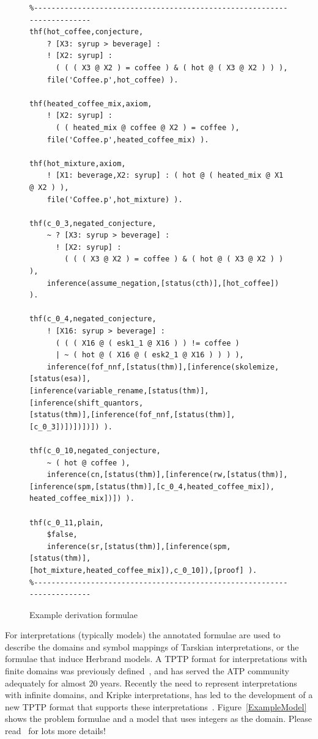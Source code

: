 \documentclass[runningheads]{llncs}
\begin{document}
\begin{figure}[h!]
\centering
{\footnotesize
{\setlength{\baselineskip}{3mm}
\begin{verbatim}
%------------------------------------------------------------------------
thf(hot_coffee,conjecture,
    ? [X3: syrup > beverage] :
    ! [X2: syrup] :
      ( ( ( X3 @ X2 ) = coffee ) & ( hot @ ( X3 @ X2 ) ) ),
    file('Coffee.p',hot_coffee) ).

thf(heated_coffee_mix,axiom,
    ! [X2: syrup] :
      ( ( heated_mix @ coffee @ X2 ) = coffee ),
    file('Coffee.p',heated_coffee_mix) ).

thf(hot_mixture,axiom,
    ! [X1: beverage,X2: syrup] : ( hot @ ( heated_mix @ X1 @ X2 ) ),
    file('Coffee.p',hot_mixture) ).

thf(c_0_3,negated_conjecture,
    ~ ? [X3: syrup > beverage] :
      ! [X2: syrup] :
        ( ( ( X3 @ X2 ) = coffee ) & ( hot @ ( X3 @ X2 ) ) ),
    inference(assume_negation,[status(cth)],[hot_coffee]) ).

thf(c_0_4,negated_conjecture,
    ! [X16: syrup > beverage] :
      ( ( ( X16 @ ( esk1_1 @ X16 ) ) != coffee )
      | ~ ( hot @ ( X16 @ ( esk2_1 @ X16 ) ) ) ),
    inference(fof_nnf,[status(thm)],[inference(skolemize,[status(esa)],
[inference(variable_rename,[status(thm)],[inference(shift_quantors,
[status(thm)],[inference(fof_nnf,[status(thm)],[c_0_3])])])])]) ).

thf(c_0_10,negated_conjecture,
    ~ ( hot @ coffee ),
    inference(cn,[status(thm)],[inference(rw,[status(thm)],
[inference(spm,[status(thm)],[c_0_4,heated_coffee_mix]),
heated_coffee_mix])]) ).

thf(c_0_11,plain,
    $false,
    inference(sr,[status(thm)],[inference(spm,[status(thm)],
[hot_mixture,heated_coffee_mix]),c_0_10]),[proof] ).
%------------------------------------------------------------------------
\end{verbatim}
}}
\caption{Example derivation formulae}
\label{ExampleDerivationFormulae}
\end{figure}

For interpretations (typically models) the annotated formulae are used to describe the domains
and symbol mappings of Tarskian interpretations, or the formulae that induce Herbrand models.
A TPTP format for interpretations with finite domains was previously defined~\cite{SS+06}, 
and has served the ATP community adequately for almost 20 years. 
Recently the need to represent interpretations with infinite domains, and Kripke interpretations, 
has led to the development of a new TPTP format that supports these interpretations~\cite{SSP24}.
Figure~\ref{ExampleModel} shows the problem formulae and a model that uses integers as the domain.
Please read~\cite{SSP24} for lots more details!
\end{document}
